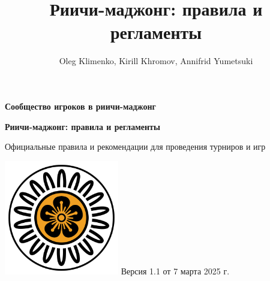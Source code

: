 \documentclass[a4paper]{article}
\author{Oleg Klimenko, Kirill Khromov, Annifrid Yumetsuki}
\title{Риичи-маджонг: правила и регламенты}
\begin{document}
	\setlength\parindent{15pt}
	\pagestyle{empty}
	\begin{center}
		\LARGE
		{\bfseries Сообщество игроков в риичи-маджонг\par}
		\vspace{4cm}
		{\huge\bfseries Риичи-маджонг: правила и регламенты\par}
		\vspace{3cm}
		\par
		
		\normalsize
		Официальные правила и рекомендации для проведения турниров и игр\par
		\vspace{5cm}
		\includegraphics[width=5cm]{logo}
		\vfill
		Версия 1.1 от 7 марта 2025 г.
	\end{center}
	\newpage
	
	\tableofcontents
	\newpage
	
	\pagestyle{plain}
	
	
	\newpage
	
	\newpage
	
	\newpage
	
	\newpage
	
	\newpage
	
	\newpage
	
	\newpage
	
	\newpage
	
	\newpage
	
	\newpage
	
	\newpage
	
	
\end{document}

